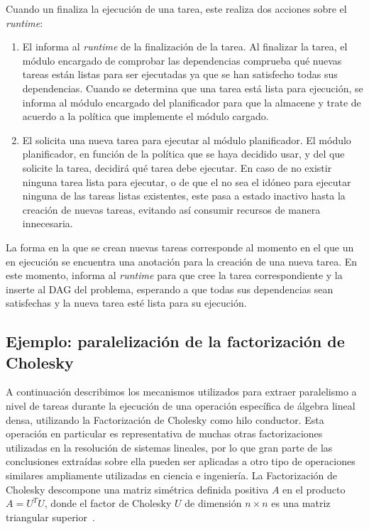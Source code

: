 Cuando un \wt finaliza la ejecución de una tarea, este realiza dos acciones
sobre el \emph{runtime}:
\begin{enumerate}
\item El \wt informa al \emph{runtime} de la finalización de la tarea. Al
  finalizar la tarea, el módulo encargado de comprobar las dependencias
  comprueba qué nuevas tareas están listas para ser ejecutadas ya que se
  han satisfecho todas sus dependencias. Cuando se determina que una tarea
  está lista para ejecución, se informa al módulo encargado del
  planificador para que la almacene y trate de acuerdo a la política que
  implemente el módulo cargado.
\item El \wt solicita una nueva tarea para ejecutar al módulo
  planificador. El módulo planificador, en función de la política que se
  haya decidido usar, y del \wt que solicite la tarea, decidirá qué tarea
  debe ejecutar. En caso de no existir ninguna tarea lista para ejecutar, o
  de que el \wt no sea el idóneo para ejecutar ninguna de las tareas listas
  existentes, este pasa a estado inactivo hasta la creación de nuevas
  tareas, evitando así consumir recursos de manera innecesaria.
\end{enumerate}

La forma en la que se crean nuevas tareas corresponde al momento en el que
un \wt en ejecución se encuentra una anotación para la creación de una
nueva tarea. En este momento, \wt informa al \emph{runtime} para que cree
la tarea correspondiente y la inserte al DAG del problema, esperando a que
todas sus dependencias sean satisfechas y la nueva tarea esté lista para su
ejecución.



\subsection{Ejemplo: paralelización de la factorización de Cholesky}

A continuación describimos los mecanismos utilizados para extraer
paralelismo a nivel de tareas durante la ejecución de una operación
específica de álgebra lineal densa, utilizando la Factorización de Cholesky
como hilo conductor. Esta operación en particular es representativa de
muchas otras factorizaciones utilizadas en la resolución de sistemas
lineales, por lo que gran parte de las conclusiones extraídas sobre ella
pueden ser aplicadas a otro tipo de operaciones similares ampliamente
utilizadas en ciencia e ingeniería.
%
La Factorización de Cholesky descompone una matriz simétrica definida positiva
$A$ en el producto $A=U^TU$, donde el factor de Cholesky $U$ de dimensión $n \times n$ es una matriz triangular
superior~\cite{GVL3}. 

